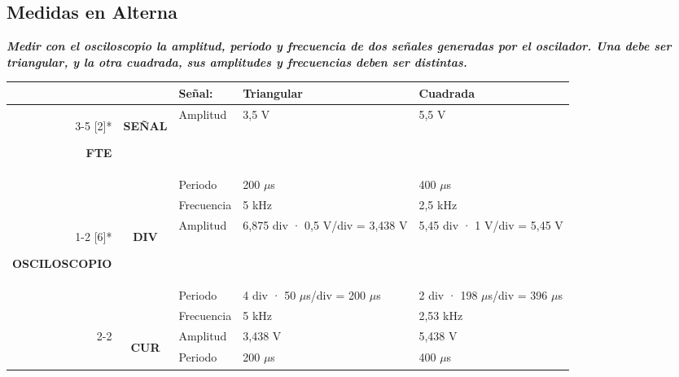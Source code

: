 \subsection{Medidas en Alterna}
\textbf{\textit{Medir con el osciloscopio la amplitud, periodo y frecuencia de dos señales generadas por el oscilador.
		Una debe ser triangular, y la otra cuadrada, sus amplitudes y frecuencias deben ser distintas.}}
\begin{table}[H]
	\centering
	\begin{tabular}{rcl|l|l|}
		&       & \multicolumn{1}{l}{\textcolor[rgb]{ .267,  .329,  .416}{\textbf{Señal:}}} & \multicolumn{1}{l}{\textcolor[rgb]{ .267,  .329,  .416}{\textbf{Triangular}}} & \multicolumn{1}{l}{\textcolor[rgb]{ .267,  .329,  .416}{\textbf{Cuadrada}}} \\
		\cmidrule{3-5}    \multirow{3}[2]{*}{\textcolor[rgb]{ .267,  .329,  .416}{\begin{sideways}\textbf{FTE}\end{sideways}}} & \multicolumn{1}{l}{\multirow{3}[2]{*}{\textcolor[rgb]{ .267,  .329,  .416}{\begin{sideways}\textbf{SEÑAL}\end{sideways}}}} & Amplitud & 3,5 V & 5,5 V \\
		&       & Periodo & 200 $ \mu $s & 400 $ \mu $s \\
		&       & Frecuencia & 5 kHz & 2,5 kHz \\
		\cmidrule{1-2}    \multirow{9}[6]{*}{\textcolor[rgb]{ .267,  .329,  .416}{\begin{sideways}\textbf{OSCILOSCOPIO}\end{sideways}}} & \multirow{3}[2]{*}{\textcolor[rgb]{ .267,  .329,  .416}{\begin{sideways}\textbf{DIV}\end{sideways}}} & Amplitud & 6,875 div · 0,5 V/div = 3,438 V & 5,45 div · 1 V/div =  5,45 V \\
		&       & Periodo & 4 div · 50 $ \mu $s/div = 200 $ \mu $s & 2 div · 198 $ \mu $s/div = 396 $ \mu $s \\
		&       & Frecuencia & 5 kHz & 2,53 kHz \\
		\cmidrule{2-2}          & \multirow{3}[2]{*}{\textcolor[rgb]{ .267,  .329,  .416}{\begin{sideways}\textbf{CUR}\end{sideways}}} & Amplitud & 3,438 V & 5,438 V \\
		&       & Periodo & 200 $ \mu $s & 400 $ \mu $s \\

\end{tabular}
\end{table}
